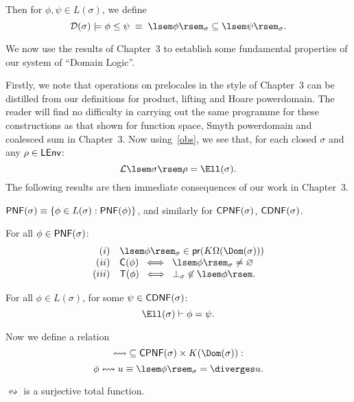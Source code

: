 Then for $\phi , \psi \in L(\sigma )$, we define
\[ \cal D (\sigma ) \models \phi \leq \psi \; \equiv \; \lsem \phi 
\rsem_{\sigma}
\subseteq \lsem \psi \rsem_{\sigma}. \]

We now use the results of Chapter~3 to establish some fundamental properties
of our system of ``Domain Logic''.

Firstly, we note that operations on prelocales in the style of
Chapter~3 can be distilled from our definitions for product, lifting and
Hoare powerdomain.
The reader will find no difficulty in carrying out the same
programme for these constructions as that shown for function space,
Smyth powerdomain and coalesced sum in Chapter~3.
Now using~\ref{obs}, we see that, for each closed $\sigma$ and any $\rho \in {\sf LEnv}$:
\[ {\cal L} \lsem \sigma \rsem \rho = \Ell (\sigma ) . \]
The following results are then immediate consequences of our work
in Chapter~3.

 ${\sf PNF}(\sigma ) \equiv \{ \phi \in L(\sigma ) :
{\sf PNF}(\phi ) \}$, 
and similarly for ${\sf CPNF}(\sigma )$, ${\sf CDNF}(\sigma )$.
\begin{proposition}
\label{metap}
For all $\phi \in {\sf PNF}(\sigma )$:
\[ \begin{array}{rl}
(i) & \lsem \phi \rsem_{\sigma} \in {\sf pr}(K \Omega (\Dom (\sigma ))) \\
(ii) & {\sf C}(\phi ) \;\; \Longleftrightarrow \;\; \lsem \phi \rsem_{\sigma}
\not= \varnothing \\
(iii) & {\sf T}(\phi ) \;\; \Longleftrightarrow \;\; \bot_{\sigma} \not\in \lsem \phi \rsem .
\end{array} \]
\end{proposition}
\begin{lemma}
\label{dptnf}
For all $\phi \in L(\sigma )$, for some $\psi \in {\sf CDNF}(\sigma )$:
\[ \Ell (\sigma ) \vdash \phi = \psi . \]
\end{lemma}

Now we define a relation
\[ {\leftrightsquigarrow} \subseteq {\sf CPNF}(\sigma ) \times K( \Dom (\sigma )):\]
\[ \phi \leftrightsquigarrow u \equiv \lsem \phi \rsem_{\sigma} = \diverges u. \]
\begin{proposition}
\label{squig}
$\leftrightsquigarrow$ is a surjective total function.
\end{proposition}

